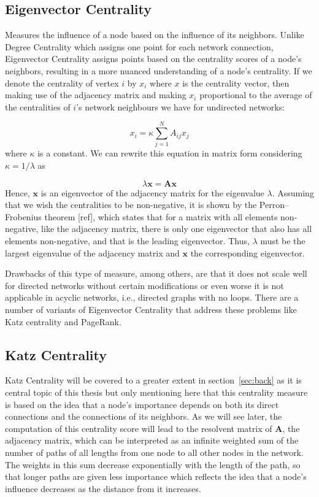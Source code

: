 \subsection*{Eigenvector Centrality} Measures the influence of a node based on the influence of its neighbors. Unlike Degree Centrality which assigns one point for each network connection, Eigenvector Centrality assigns points based on the centrality scores of a node's neighbors, resulting in a more nuanced understanding of a node's centrality. If we denote the centrality of vertex $i$ by $x_i$ where $x$ is the centrality vector, then making use of the adjacency matrix and making $x_i$ proportional to the average of the centralities of $i$’s network neighbours we have for undirected networks:

\begin{equation}
\label{eqn:eigc}
    x_i= \kappa\sum_{j=1}^{N}A_{ij}x_j
\end{equation}
where $\kappa$ is a constant. We can rewrite this equation in matrix form considering $\kappa=1/\lambda$ as

\begin{equation}
    \lambda \mathbf{x} = \mathbf{A}\mathbf{x}
\end{equation}
Hence, $\mathbf{x}$ is an eigenvector of the adjacency matrix for the eigenvalue $\lambda$. Assuming that we wish the centralities to be non-negative, it is shown by the Perron–Frobenius theorem [ref], which states that for a matrix with all elements non-negative, like the adjacency matrix, there is only one eigenvector that also has all elements non-negative, and that is the leading eigenvector. Thus, $\lambda$ must be the largest eigenvalue of the adjacency matrix and $\mathbf{x}$ the corresponding eigenvector. 

Drawbacks of this type of measure, among others, are that it does not scale well for directed networks without certain modifications or even worse it is not applicable in acyclic networks, i.e., directed graphs with no loops. There are a number of variants of Eigenvector Centrality that address these
problems like Katz centrality and PageRank.

\subsection*{Katz Centrality}
Katz Centrality will be covered to a greater extent in section~\ref{sec:back} as it is central topic of this thesis but only mentioning here that this centrality measure is based on the idea that a node's importance depends on both its direct connections and the connections of its neighbors. As we will see later, the computation of this centrality score will lead to the resolvent matrix of $\mathbf{A}$, the adjacency matrix, which can be interpreted as an infinite weighted sum of the number of paths of all lengths from one node to all other nodes in the network. The weights in this sum decrease exponentially with the length of the path, so that longer paths are given less importance which reflects the idea that a node's influence decreases as the distance from it increases. 


